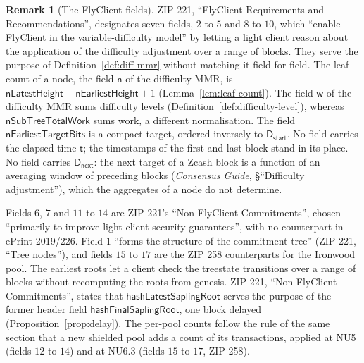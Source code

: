 \documentclass[11pt,a4paper]{article}
\theoremstyle{definition}
\newtheorem{remark}[theorem]{Remark}
\begin{document}
\begin{remark}[The FlyClient fields]\label{rem:flyclient-fields}
ZIP 221, ``FlyClient Requirements and Recommendations'', designates seven
fields, $2$ to $5$ and $8$ to $10$, which ``enable FlyClient in the
variable-difficulty model'' by letting a light client reason about the
application of the difficulty adjustment over a range of blocks. They serve
the purpose of Definition~\ref{def:diff-mmr} without matching it field for
field. The leaf count of a node, the field $\mathsf{n}$ of the difficulty
MMR, is $\mathsf{nLatestHeight} - \mathsf{nEarliestHeight} + 1$
(Lemma~\ref{lem:leaf-count}). The field $\mathsf{w}$ of the difficulty MMR
sums difficulty levels (Definition~\ref{def:difficulty-level}), whereas
$\mathsf{nSubTreeTotalWork}$ sums work, a different normalisation. The field
$\mathsf{nEarliestTargetBits}$ is a compact target, ordered inversely to
$\mathsf{D}_{\mathsf{start}}$. No field carries the elapsed time
$\mathsf{t}$; the timestamps of the first and last block stand in its place.
No field carries $\mathsf{D}_{\mathsf{next}}$: the next target of a Zcash
block is a function of an averaging window of preceding blocks
(\emph{Consensus Guide}, \S``Difficulty adjustment''), which the aggregates of
a node do not determine.

Fields $6$, $7$ and $11$ to $14$ are ZIP 221's ``Non-FlyClient
Commitments'', chosen ``primarily to improve light client security
guarantees'', with no counterpart in ePrint 2019/226. Field $1$ ``forms the
structure of the commitment tree'' (ZIP 221, ``Tree nodes''), and fields
$15$ to $17$ are the ZIP 258 counterparts for the Ironwood pool. The
earliest roots let a client check the treestate transitions over a range of
blocks without recomputing the roots
from genesis. ZIP 221, ``Non-FlyClient Commitments'', states that
$\mathsf{hashLatestSaplingRoot}$ serves the purpose of the former header
field $\mathsf{hashFinalSaplingRoot}$, one block delayed
(Proposition~\ref{prop:delay}). The per-pool counts follow the rule of the
same section that a new shielded pool adds a count of its transactions,
applied at NU5 (fields $12$ to $14$) and at NU6.3 (fields $15$ to $17$,
ZIP 258).
\end{remark}
\end{document}
